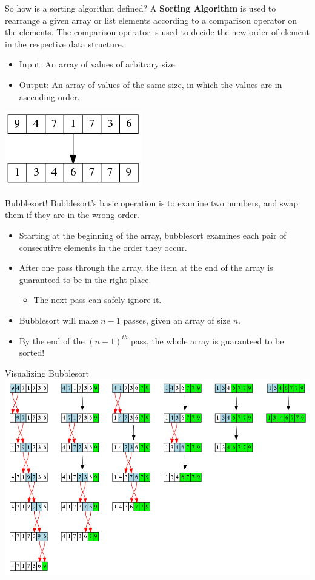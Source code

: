 \documentclass[11pt]{beamer}
\begin{document}
\begin{frame}{So how is a sorting algorithm defined?}
A \textbf{Sorting Algorithm} is used to rearrange a given array or list elements according to a comparison operator on the elements. The comparison operator is used to decide the new order of element in the respective data structure. 
\begin{itemize}
\item Input: An array of values of arbitrary size 
\item Output: An array of values of the same size, in which the values are in ascending order.  
\end{itemize}
\center
\includegraphics[scale=0.5]{graphs/sort.png}
\end{frame}

\begin{frame}{Bubblesort!}
Bubblesort's basic operation is to examine two numbers, and swap them if they are in the wrong order.  
\begin{itemize}
\item Starting at the beginning of the array, bubblesort examines each pair of consecutive elements in the order they occur.
\item After one pass through the array, the item at the end of the array is guaranteed to be in the right place.  
\begin{itemize}
\item The next pass can safely ignore it.
\end{itemize}
\item Bubblesort will make $n-1$ passes, given an array of size $n$.  
\item By the end of the $(n-1)^{th}$ pass, the whole array is guaranteed to be sorted! 
\end{itemize}
\end{frame}

\begin{frame}{Visualizing Bubblesort}
\center
\includegraphics[scale=0.25]{graphs/bubblesort.png}
\end{frame}
\end{document}
